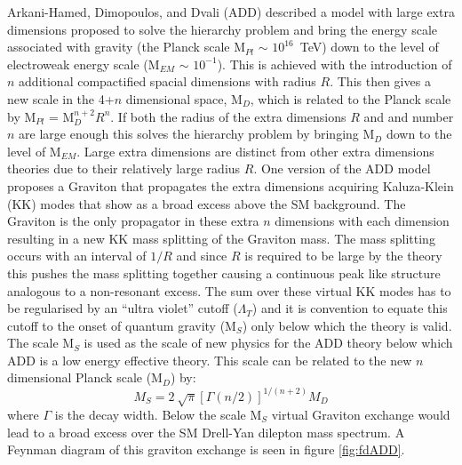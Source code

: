         Arkani-Hamed, Dimopoulos, and Dvali (ADD) \cite{ArkaniHamed:1998rs} described a model with large extra dimensions proposed to solve the hierarchy problem and bring the energy scale associated with gravity (the Planck scale M$_{Pl}$ $\sim$ $10^{16}$~TeV) down to the level of electroweak energy scale (M$_{EM}$ $\sim$ $10^{-1}$). This is achieved with the introduction of $n$ additional compactified spacial dimensions with radius $R$. This then gives a new scale in the 4+$n$ dimensional space, M$_{D}$, which is related to the Planck scale by M$_{Pl}$ = M$_{D}^{n+2}R^{n}$. If both the radius of the extra dimensions $R$ and and number $n$ are large enough this solves the hierarchy problem by bringing M$_{D}$ down to the level of M$_{EM}$. Large extra dimensions are distinct from other extra dimensions theories due to their relatively large radius $R$.
        One version of the ADD model proposes a Graviton that propagates the extra dimensions acquiring Kaluza-Klein (KK) modes that show as a broad excess above the SM background. The Graviton is the only propagator in these extra $n$ dimensions with each dimension resulting in a new KK mass splitting of the Graviton mass. The mass splitting occurs with an interval of $1/R$ and since $R$ is required to be large by the theory this pushes the mass splitting together causing a continuous peak like structure analogous to a non-resonant excess. The sum over these virtual KK modes has to be regularised by an ``ultra violet'' cutoff ($\Lambda_{T}$) and it is convention to equate this cutoff to the onset of quantum gravity (M$_{S}$) only below which the theory is valid. The scale M$_{S}$ is used as the scale of new physics for the ADD theory below which ADD is a low energy effective theory. This scale can be related to the new $n$ dimensional Planck scale (M$_{D}$) by:
        \begin{equation}
            M_{S} = 2~\sqrt{\pi}\left[{\Gamma (n/2)}\right]^{1/(n+2)}M_{D}
            \label{eq:gravScale}
        \end{equation}
        where $\Gamma$ is the decay width. Below the scale M$_{S}$ virtual Graviton exchange would lead to a broad excess over the SM Drell-Yan dilepton mass spectrum. A Feynman diagram of this graviton exchange is seen in figure \ref{fig:fdADD}.

